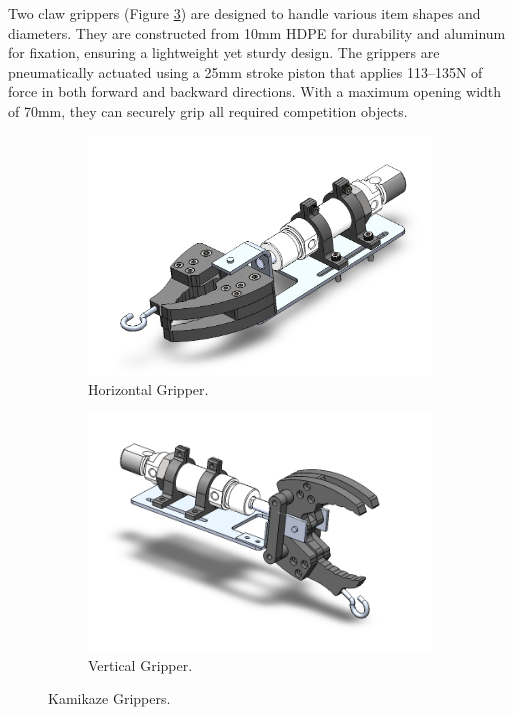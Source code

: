 Two claw grippers (Figure \ref{fig:grippers}) are designed to handle various item shapes and diameters. They are constructed from 10mm HDPE for durability and aluminum for fixation, ensuring a lightweight yet sturdy design. The grippers are pneumatically actuated using a 25mm stroke piston that applies 113–135N of force in both forward and backward directions. With a maximum opening width of 70mm, they can securely grip all required competition objects.

\begin{figure}[h]
    \centering
    \begin{subfigure}[b]{0.49\columnwidth}
        \includegraphics[width=\textwidth]{Sections/2Design Rationale/images/Horizontal.png}
        \caption{Horizontal Gripper.}
        \label{fig:horizontal_gripper}
    \end{subfigure}
    \hfill
    \begin{subfigure}[b]{0.49\columnwidth}
        \includegraphics[width=\textwidth]{Sections/2Design Rationale/images/Vertical.png}
        \caption{Vertical Gripper.}
        \label{fig:vertical_gripper}
    \end{subfigure}
    \caption{Kamikaze Grippers.}
    \label{fig:grippers}
\end{figure}

